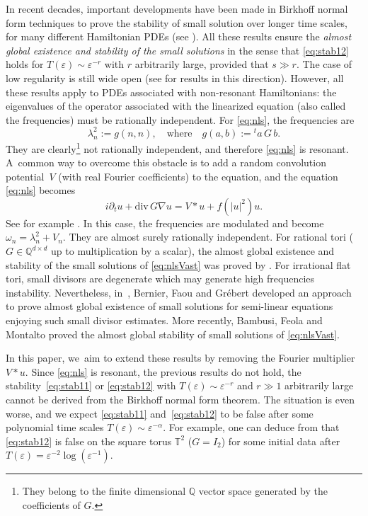 \documentclass[JEP,XML,SOM,Unicode,published]{cedram}
\theoremstyle{plain}
\theoremstyle{definition}
\newcommand{\1}{\mathbf{1}}
\begin{document}
In recent decades, important developments have been made in Birkhoff normal form techniques to prove the stability of small solution over longer time scales, for many different Hamiltonian PDEs (see \eg \cite{BG06,BDGS07,GIP,Del12,FGL13,BD17,BMM22}). All these results ensure the \emph{almost global existence and stability of the small solutions} in the sense that \eqref{eq:stab12} holds for $T(\varepsilon) \sim \varepsilon^{-r}$ with $r$ arbitrarily large, provided that $s\gg r$. The case of low regularity is still wide open (see \eg \cite{BG22,BGR23} for results in this direction). However, all these results apply to PDEs associated with non-resonant Hamiltonians: the eigenvalues of the operator associated with the linearized equation (also called the frequencies) must be rationally independent. For \eqref{eq:nls}, the frequencies are
\[
\lambda_n^2:= g(n,n), \quad \mathrm{where} \quad g(a,b):={} ^t\!a\,G\, b.
\]
They are clearly\footnote{They belong to the finite dimensional $\mathbb{Q}$ vector space generated by the coefficients of $G$.} not rationally independent, and therefore \eqref{eq:nls} is resonant. A~common way to overcome this obstacle is to add a random convolution potential~$V$ (with real Fourier coefficients) to the equation, and the equation \eqref{eq:nls} becomes
\begin{equation}
\label{eq:nlsVast}
\tag{NLS*}
i\partial_{t}u + \mathrm{div} \, G \nabla u = V\ast u+ f(|u|^{2})u.
\end{equation}
See for example \cite{BG06,YZ14,FI19,BMP20,BG22,BFM22}. In this case, the frequencies are modulated and become $\omega_n = \lambda_n^2+ V_n$. They are almost surely rationally independent. For rational tori (\ie $G\in \mathbb{Q}^{d\times d}$ up to multiplication by a scalar), the almost global existence and stability of the small solutions of \eqref{eq:nlsVast} was proved by \cite{BG06}. For irrational flat tori, small divisors are degenerate which may generate high frequencies instability. Nevertheless, in~\cite{BFG20b}, Bernier, Faou and Grébert developed an approach to prove almost global existence of small solutions for semi-linear equations enjoying such small divisor estimates. More recently, Bambusi, Feola and Montalto \cite{BFM22} proved the almost global stability of small solutions of \eqref{eq:nlsVast}.

In this paper, we~aim to extend these results by removing the Fourier multiplier $V\ast u$. Since \eqref{eq:nls} is resonant, the previous results do not hold, \ie the stability~\eqref{eq:stab11} or \eqref{eq:stab12} with $T(\varepsilon) \sim \varepsilon^{-r}$ and $r\gg1$ arbitrarily large cannot be derived from the Birkhoff normal form theorem. The situation is even worse, and we expect \eqref{eq:stab11} and~\eqref{eq:stab12} to be false after some polynomial time scales $T(\varepsilon) \sim \varepsilon^{-\alpha}$. For example, one can deduce from \cite{CKSTT} that \eqref{eq:stab12} is false on the square torus $\mathbb{T}^2$ (\ie $G= I_2$) for some initial data after $T(\varepsilon)=\varepsilon^{-2} \log(\varepsilon^{-1})$.
\end{document}
